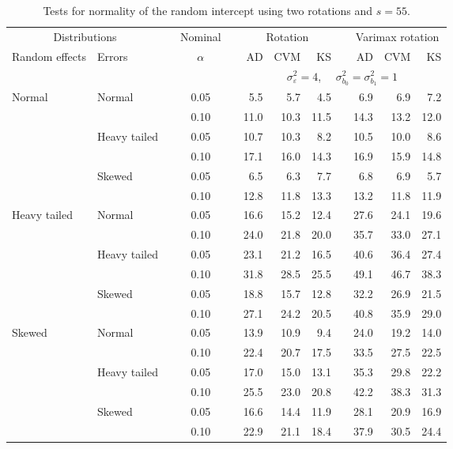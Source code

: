 \begin{table}[ht]
\caption{\label{tab:simb0s55-alt}Tests for normality of the random intercept using two rotations and $s = 55$.}
\begin{scriptsize}
\begin{center}
\begin{tabular}{ll p{.1cm} c p{.1cm} rrr p{.1cm} rrr}
  \hline
  \multicolumn{2}{c}{Distributions}& & Nominal & &  \multicolumn{3}{c}{Rotation} & & \multicolumn{3}{c}{Varimax rotation} \\ \cline{1-2} \cline{6-8} \cline{10-12}   
  Random effects & Errors & & $\alpha$ & & AD & CVM & KS & & AD & CVM & KS \\ 
   \hline
& && && \multicolumn{7}{c}{$\sigma_{\varepsilon}^2 = 4$, \ \ $\sigma_{b_0}^2 = \sigma_{b_1}^2 = 1$} \\ \cline{6-12}
Normal       & Normal       && 0.05 &&   5.5 & 5.7 & 4.5 &   & 6.9 & 6.9 & 7.2 \\ 
             &              && 0.10 &&   11.0 & 10.3 & 11.5 &   & 14.3 & 13.2 & 12.0 \\ 
             & Heavy tailed && 0.05 &&   10.7 & 10.3 & 8.2 &   & 10.5 & 10.0 & 8.6 \\ 
             &              && 0.10 &&   17.1 & 16.0 & 14.3 &   & 16.9 & 15.9 & 14.8 \\ 
             & Skewed       && 0.05 &&   6.5 & 6.3 & 7.7 &   & 6.8 & 6.9 & 5.7 \\ 
             &              && 0.10 &&   12.8 & 11.8 & 13.3 &   & 13.2 & 11.8 & 11.9 \\ 
Heavy tailed & Normal       && 0.05 &&   16.6 & 15.2 & 12.4 &   & 27.6 & 24.1 & 19.6 \\ 
             &              && 0.10 &&   24.0 & 21.8 & 20.0 &   & 35.7 & 33.0 & 27.1 \\ 
             & Heavy tailed && 0.05 &&   23.1 & 21.2 & 16.5 &   & 40.6 & 36.4 & 27.4 \\ 
             &              && 0.10 &&   31.8 & 28.5 & 25.5 &   & 49.1 & 46.7 & 38.3 \\ 
             & Skewed       && 0.05 &&   18.8 & 15.7 & 12.8 &   & 32.2 & 26.9 & 21.5 \\ 
             &              && 0.10 &&   27.1 & 24.2 & 20.5 &   & 40.8 & 35.9 & 29.0 \\ 
Skewed       & Normal       && 0.05 &&   13.9 & 10.9 & 9.4 &   & 24.0 & 19.2 & 14.0 \\ 
             &              && 0.10 &&   22.4 & 20.7 & 17.5 &   & 33.5 & 27.5 & 22.5 \\ 
             & Heavy tailed && 0.05 &&   17.0 & 15.0 & 13.1 &   & 35.3 & 29.8 & 22.2 \\ 
             &              && 0.10 &&   25.5 & 23.0 & 20.8 &   & 42.2 & 38.3 & 31.3 \\ 
             & Skewed       && 0.05 &&   16.6 & 14.4 & 11.9 &   & 28.1 & 20.9 & 16.9 \\ 
             &              && 0.10 &&   22.9 & 21.1 & 18.4 &   & 37.9 & 30.5 & 24.4 \\ 


\end{tabular}
\end{center}
\end{scriptsize}
\end{table}
